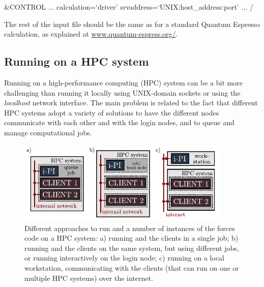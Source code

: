 \documentclass[11pt,english,fleqn]{report}
\newenvironment{code}{%
\footnotesize 
\verbatim
}{
\endverbatim
\normalsize
}
\begin{document}
\begin{code}
&CONTROL
   ...
   calculation=`driver'
   srvaddress=`UNIX:host_address:port'
   ...
/
\end{code}

The rest of the input file should be the same as for a standard Quantum
Espresso calculation, as explained at \url{www.quantum-espress.org/}.

\subsection{Running on a HPC system}\label{hpc}

Running \ipi on a high-performance computing (HPC) system can be a bit more challenging
than running it locally using UNIX-domain sockets or using the \emph{localhost} 
network interface.
The main problem is related to the fact that different HPC systems adopt
a variety of solutions to have the different nodes communicate with each other
and with the login nodes, and to queue and manage computational jobs. 
 
\begin{figure}[hbt]
\centering\includegraphics[width=0.9\textwidth]{ipi-running.pdf}
\caption{\label{fig:running} Different approaches to run \ipi and a number of 
instances of the forces code on a HPC system: a) running \ipi and the clients in a single
job; b) running \ipi and the clients on the same system, but using different jobs, or running
\ipi interactively on the login node; c) running \ipi on a local workstation, communicating
with the clients (that can run on one or multiple HPC systems) over the internet. } 
\end{figure}
\end{document}
